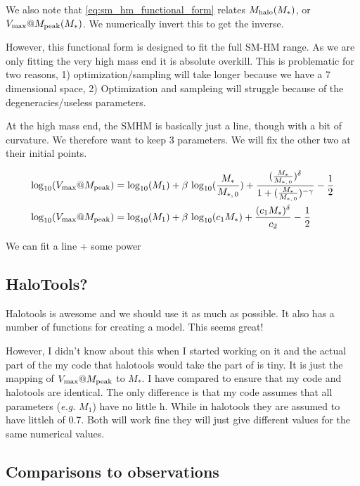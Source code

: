 \documentclass{article}
\makeatletter
\newcommand{\Mhalo}{\ensuremath{M_{\rm halo}}}
\newcommand{\vmp}{\ensuremath{V_{\rm max}@M_{\rm peak}}}
\newcommand{\tlogten}{{\rm log}_{10}}
\newcommand{\Mstar}{\ensuremath{M_{\ast}}}
\newcommand{\M}[1]{\ensuremath{M_{\ast,\,\rm #1}}}
\newcommand{\eg}{{\it e.g.\/}}
\makeatother
\begin{document}
We also note that \autoref{eq:sm_hm_functional_form} relates $\Mhalo(\Mstar)$, or $\vmp(\Mstar)$. We numerically invert this to get the inverse.

However, this functional form is designed to fit the full SM-HM range. As we are only fitting the very high mass end it is absolute overkill. This is problematic for two reasons, 1) optimization/sampling will take longer because we have a 7 dimensional space, 2) Optimization and sampleing will struggle because of the degeneracies/useless parameters.

At the high mass end, the SMHM is basically just a line, though with a bit of curvature. We therefore want to keep 3 parameters. We will fix the other two at their initial points.

\begin{equation}
    \begin{aligned}
        &\tlogten{}(\vmp{}) = \tlogten{}(M_1) + \beta~\tlogten{}(\frac{\Mstar{}}{\M{0}}) + \frac{(\frac{\Mstar{}}{\M{0}})^{\delta}}{1 + (\frac{\Mstar{}}{\M{0}})^{- \gamma}} - \frac{1}{2} \\
        &\tlogten{}(\vmp{}) = \tlogten{}(M_1) + \beta~\tlogten{}(c_1 \Mstar{}) + \frac{(c_1 \Mstar{})^{\delta}}{c_2} - \frac{1}{2}
    \end{aligned}
\end{equation}

We can fit a line + some power

\subsection{HaloTools?}

Halotools is awesome and we should use it as much as possible. It also has a number of functions for creating a \cite{Behroozi2010} model. This seems great!

However, I didn't know about this when I started working on it and the actual part of the my code that halotools would take the part of is tiny. It is just the mapping of \vmp{} to \Mstar{}.
I have compared to ensure that my code and halotools are identical. The only difference is that my code assumes that all parameters (\eg{} $M_1$) have no little h. While in halotools they are assumed to have littleh of 0.7. Both will work fine they will just give different values for the same numerical values.

\subsection{Comparisons to observations}
\end{document}
